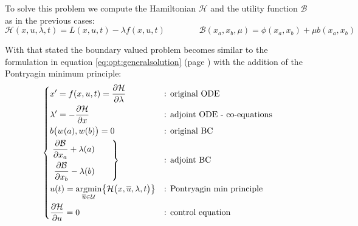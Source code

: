 To solve this problem we compute the Hamiltonian $\mathcal H$ and the utility function $\mathcal B$ as in the previous cases:
\[ \mathcal H (x,u, \lambda,t) = L(x,u,t) - \lambda f(x,u,t) \qquad \qquad \mathcal B (x_a,x_b,\mu) = \phi(x_a,x_b) + \mu b(x_a,x_b) \]

With that stated the boundary valued problem becomes similar to the formulation in equation \ref{eq:opt:generalsolution} (page \pageref{eq:opt:generalsolution}) with the addition of the Pontryagin minimum principle:
\begin{equation} 
	\left\{ \begin{aligned}
		& x' = f(x,u,t) = \frac{\partial \mathcal H}{\partial \lambda} && \textrm{: original ODE} \\
		&\lambda' = - \frac{\partial \mathcal H}{\partial x} && \textrm{: adjoint ODE - co-equations} \\
		&b\big(w(a),w(b)\big) = 0 && \textrm{: original BC} \\
		&\left. \begin{aligned}
			\frac{\partial \mathcal B}{\partial x_a} + \lambda(a) \\
			\frac{\partial \mathcal B}{\partial x_b} - \lambda(b)
		\end{aligned} \qquad \right\} &&\textrm{: adjoint BC} \\
		& u(t) = \underset{\overline u \in \mathcal U}{\textrm{argmin}} \big\{ \mathcal{H}\big(x, \overline u,\lambda, t\big) \big\} && \textrm{: Pontryagin min principle} \\
		& \frac{\partial \mathcal H}{\partial u} = 0 && \textrm{: control equation}			
	\end{aligned} \right. 
\end{equation}



